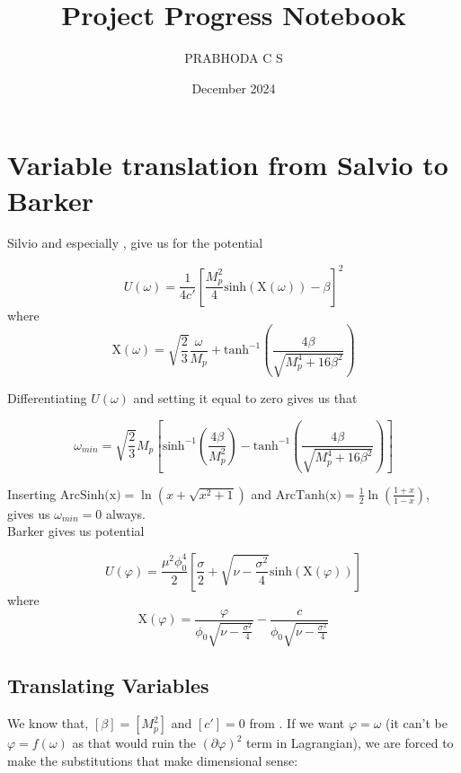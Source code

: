 \documentclass{article}
\title{Project Progress Notebook}
\author{PRABHODA C S}
\date{December 2024}
\begin{document}
\maketitle

\section{Variable translation from Salvio to Barker}  \label{Section 1}
Silvio \cite{Salvio_2022} and especially \cite{Pradisi_2022}, give us for the potential

\begin{equation}
    U(\omega) = \frac{1}{4 c'} \left[ \frac{M_{p}^{2}}{4} \text{sinh}(\text{X}(\omega)) - \beta  \right]^2
\end{equation}
where
\begin{equation}
    \text{X}(\omega) = \sqrt{\frac{2}{3}} \frac{\omega}{M_{p}} + \text{tanh}^{-1} \left(\frac{4 \beta}{\sqrt{M_{p}^{4}+16 \beta^2}} \right)
\end{equation}

Differentiating $U(\omega)$ and setting it equal to zero gives us that 

\begin{equation}
    \omega_{min} = \sqrt{\frac{2}{3}} M_p \left[ \text{sinh}^{-1}\left(\frac{4\beta}{M_{p}^{2}}\right) - \text{tanh}^{-1}\left(\frac{4\beta}{\sqrt{M_{p}^{4} + 16\beta^2}}\right) \right]
\end{equation}

Inserting $\text{ArcSinh(x)} = \ln(x + \sqrt{x^2 + 1})$ and $\text{ArcTanh(x)} = \frac{1}{2} \ln\left(\frac{1+x}{1-x}\right)$, gives us $\omega_{min} = 0$ always.
\\
Barker \cite{barker2024poincaregaugetheoryconformal} gives us potential

\begin{equation}
    U(\varphi) = \frac{\mu^2 \phi_{0}^{4}}{2} \left[ \frac{\sigma}{2} + \sqrt{\nu - \frac{\sigma^2}{4}} \text{sinh}\left( \text{X}(\varphi) \right)  \right]
\end{equation}
where
\begin{equation}
    \text{X}(\varphi) =  \frac{\varphi}{\phi_0 \sqrt{\nu - \frac{\sigma^2}{4}}} - \frac{c}{\phi_0 \sqrt{\nu - \frac{\sigma^2}{4}}}
\end{equation}

\subsection{Translating Variables}   \label{Section 1.1}
We know that, $[\beta] = [M_{p}^{2}]$  and $[c'] = 0$ from \cite{Pradisi_2022}. If we want $\varphi = \omega$ (it can't be $\varphi = f(\omega)$ as that would ruin the $(\partial\varphi)^2$ term in Lagrangian), we are forced to make the substitutions that make dimensional sense:
\end{document}
